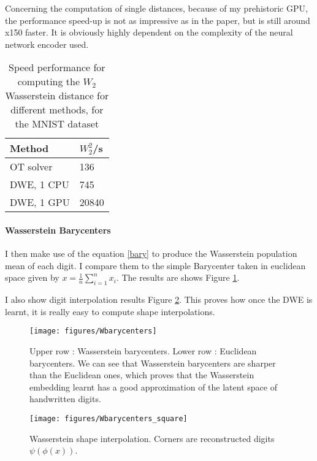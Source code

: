 \documentclass{article}
\begin{document}
Concerning the computation of single distances, because of my prehistoric GPU, the performance speed-up is not as impressive as in the paper, but is still around x150 faster. It is obviously highly dependent on the complexity of the neural network encoder used.

\begin{table}[]
	\centering
	\begin{tabular}{|l|l|}
		\hline
		Method     & $W^2_2$/s \\ \hline
		OT solver  & 136       \\ \hline
		DWE, 1 CPU & 745       \\ \hline
		DWE, 1 GPU & 20840     \\ \hline
	\end{tabular}
	\caption{Speed performance for computing the $W_2$ Wasserstein distance for different methods, for the MNIST dataset}
	\label{tab:speed}
\end{table}


\paragraph{Wasserstein Barycenters} I then make use of the equation \eqref{bary} to produce the Wasserstein population mean of each digit. I compare them to the simple Barycenter taken in euclidean space given by $x = \frac{1}{n} \sum_{i=1}^{n} x_i$.
The results are shows Figure \ref{fig:bary}.

I also show digit interpolation results Figure \ref{fig:bary_sq}. This proves how once the DWE is learnt, it is really easy to compute shape interpolations.

\begin{figure}[!htb]
	\centering
	\texttt{[image: figures/Wbarycenters]}
	\caption{Upper row : Wasserstein barycenters. Lower row : Euclidean barycenters. We can see that Wasserstein barycenters are sharper than the Euclidean ones, which proves that the Wasserstein embedding learnt has a good approximation of the latent space of handwritten digits.}
	\label{fig:bary}
\end{figure}

\begin{figure}[!htb]
	\centering
	\texttt{[image: figures/Wbarycenters\_square]}
	\caption{Wasserstein shape interpolation. Corners are reconstructed digits $\psi(\phi(x))$.}
	\label{fig:bary_sq}
\end{figure}
\end{document}
